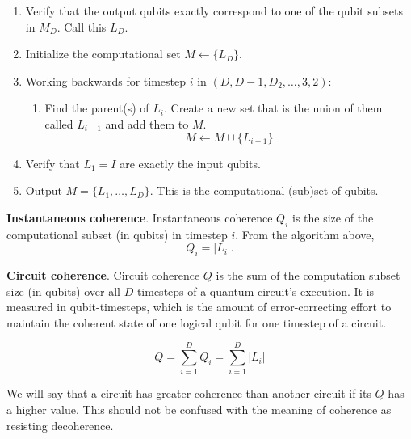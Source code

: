 \begin{enumerate}
\begin{enumerate}
\item
Verify that the output qubits exactly correspond to one of the qubit subsets
in $M_D$. Call this $L_D$.
\item
Initialize the computational set $M \leftarrow \{ L_D \}$.
\item
Working backwards for timestep $i$ in $(D, D-1, D_2, \ldots, 3, 2)$:
\begin{enumerate}
\item
Find the parent(s) of $L_i$. Create a new set that is the union of them called $L_{i-1}$
and add them to $M$.
\begin{equation}
M \leftarrow M \cup \{L_{i-1}\}
\end{equation}
\end{enumerate}

\item Verify that $L_1 = I$ are exactly the input qubits.

\item Output $M = \{L_1, \ldots, L_D\}$. This is the computational (sub)set of qubits.
\end{enumerate}

\end{enumerate}

\begin{definition}{\textbf{Instantaneous coherence}.}
Instantaneous coherence $Q_i$ is the size of the computational subset
(in qubits) in timestep $i$. From the algorithm above,
\begin{equation}
Q_i = |L_i|\text{.}
\end{equation}
\end{definition}

\begin{definition}{\textbf{Circuit coherence}.}
Circuit coherence $Q$ is the sum of the computation subset size (in qubits)
over all $D$ timesteps of a quantum circuit's execution. It is measured
in qubit-timesteps, which is the amount of error-correcting effort to
maintain the coherent state of one logical qubit for one timestep of a circuit.

\begin{equation}
Q = \sum_{i=1}^D Q_i = \sum_{i=1}^D |L_i|
\end{equation}
\end{definition}

We will say that a circuit has greater coherence than another circuit if
its $Q$ has a higher value. This should not be confused with the
meaning of coherence as resisting decoherence.

